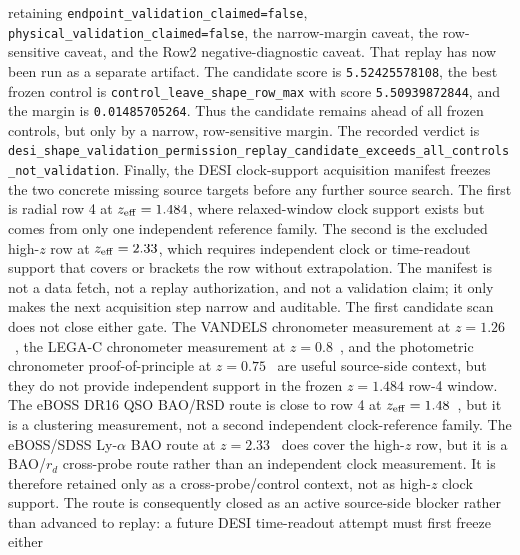 \documentclass[11pt]{article}
\begin{document}
retaining \texttt{endpoint\_\allowbreak{}validation\_\allowbreak{}claimed=\allowbreak{}false},
\texttt{physical\_\allowbreak{}validation\_\allowbreak{}claimed=\allowbreak{}false}, the narrow-margin caveat, the
row-sensitive caveat, and the Row2 negative-diagnostic caveat.  That replay has
now been run as a separate artifact.  The candidate score is
\texttt{5.52425578108}, the best frozen control is
\texttt{control\_\allowbreak{}leave\_\allowbreak{}shape\_\allowbreak{}row\_\allowbreak{}max} with score
\texttt{5.50939872844}, and the margin is
\texttt{0.01485705264}.  Thus the candidate remains ahead of all frozen
controls, but only by a narrow, row-sensitive margin.  The recorded verdict is
\texttt{desi\_\allowbreak{}shape\_\allowbreak{}validation\_\allowbreak{}permission\_\allowbreak{}replay\_\allowbreak{}candidate\_\allowbreak{}exceeds\_\allowbreak{}all\_\allowbreak{}controls\_\allowbreak{}not\_\allowbreak{}validation}.
Finally, the DESI clock-support acquisition manifest freezes the two concrete
missing source targets before any further source search.  The first is radial row
4 at \(z_{\rm eff}=1.484\), where relaxed-window clock support exists but comes
from only one independent reference family.  The second is the excluded
high-\(z\) row at \(z_{\rm eff}=2.33\), which requires independent clock or
time-readout support that covers or brackets the row without extrapolation.  The
manifest is not a data fetch, not a replay authorization, and not a validation
claim; it only makes the next acquisition step narrow and auditable.
The first candidate scan does not close either gate. The VANDELS chronometer
measurement at \(z=1.26\)~\cite{Tomasetti2023VANDELS}, the LEGA-C chronometer
measurement at \(z=0.8\)~\cite{Jiao2023LEGAC}, and the photometric chronometer
proof-of-principle at \(z=0.75\)~\cite{Jimenez2023PhotometricCC} are useful
source-side context, but they do not provide independent support in the frozen
\(z=1.484\) row-4 window.  The eBOSS DR16 QSO BAO/RSD route is close to row 4
at \(z_{\rm eff}=1.48\)~\cite{Hou2020QSOBAORSD}, but it is a clustering
measurement, not a second independent clock-reference family.  The eBOSS/SDSS
Ly-\(\alpha\) BAO route at
\(z=2.33\)~\cite{duMasdesBourboux2020LyA,SDSSLyAForestVAC} does cover the
high-\(z\) row, but it is a BAO/\(r_d\) cross-probe route rather than an
independent clock measurement.  It is therefore retained only as a
cross-probe/control context, not as high-\(z\) clock support.
The route is consequently closed as an active source-side blocker rather than
advanced to replay: a future DESI time-readout attempt must first freeze either
\end{document}
